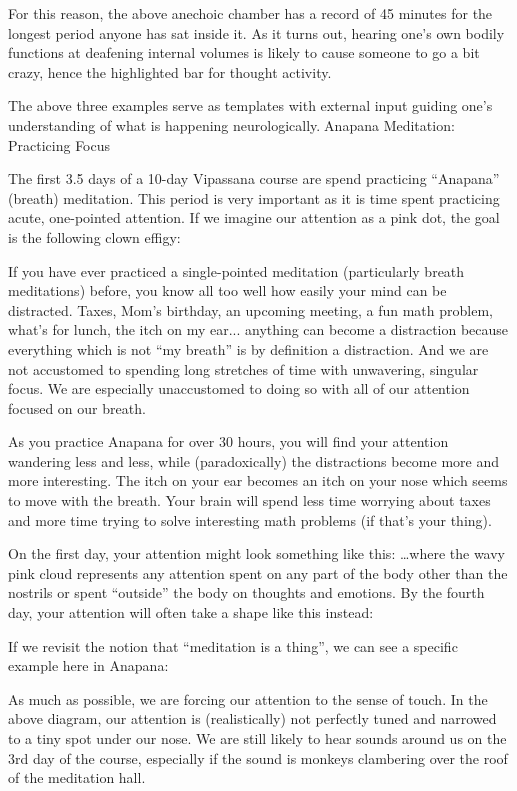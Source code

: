 \documentclass{article}
\begin{document}
For this reason, the above anechoic chamber has a record of 45 minutes for the longest period anyone has sat inside it. As it turns out, hearing one's own bodily functions at deafening internal volumes is likely to cause someone to go a bit crazy, hence the highlighted bar for thought activity.

The above three examples serve as templates with external input guiding one's understanding of what is happening neurologically.Anapana Meditation:
Practicing Focus

The first 3.5 days of a 10-day Vipassana course are spend practicing ``Anapana'' (breath) meditation. This period is very important as it is time spent practicing acute, one-pointed attention. If we imagine our attention as a pink dot, the goal is the following clown effigy:

If you have ever practiced a single-pointed meditation (particularly breath meditations) before, you know all too well how easily your mind can be distracted. Taxes, Mom's birthday, an upcoming meeting, a fun math problem, what's for lunch, the itch on my ear... anything can become a distraction because everything which is not ``my breath'' is by definition a distraction. And we are not accustomed to spending long stretches of time with unwavering, singular focus. We are especially unaccustomed to doing so with all of our attention focused on our breath.

As you practice Anapana for over 30 hours, you will find your attention wandering less and less, while (paradoxically) the distractions become more and more interesting. The itch on your ear becomes an itch on your nose which seems to move with the breath. Your brain will spend less time worrying about taxes and more time trying to solve interesting math problems (if that's your thing).

On the first day, your attention might look something like this:
…where the wavy pink cloud represents any attention spent on any part of the body other than the nostrils or spent “outside” the body on thoughts and emotions. By the fourth day, your attention will often take a shape like this instead:



If we revisit the notion that ``meditation is a thing'', we can see a specific example here in Anapana:

As much as possible, we are forcing our attention to the sense of touch. In the above diagram, our attention is (realistically) not perfectly tuned and narrowed to a tiny spot under our nose. We are still likely to hear sounds around us on the 3rd day of the course, especially if the sound is monkeys clambering over the roof of the meditation hall.
\end{document}
